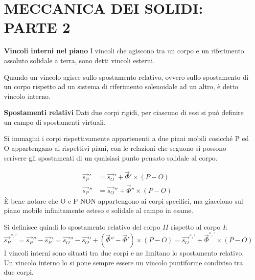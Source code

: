 \documentclass{article}
\begin{document}
	\section*{MECCANICA DEI SOLIDI: PARTE 2} %
	
	\begin{adjustwidth}{2in}{} 
		
	{\Large \textbf{Vincoli interni nel piano}} \mbox{} \newline
		I vincoli che agiscono tra un corpo e un riferimento assoluto solidale a terra, sono detti vincoli esterni. 
		
		Quando un vincolo agisce sullo spostamento relativo, ovvero sullo spostamento di un corpo rispetto ad un sistema di riferimento solenoidale ad un altro, è detto vincolo interno. \newline
		
		\textbf{Spostamenti relativi} \newline
		Dati due corpi rigidi, per ciascuno di essi si può definire un campo di spostamenti virtuali. 
		
		Si immagini i corpi rispettivamente appartenenti a due piani mobili cosicché P ed O appartengano ai rispettivi piani, con le relazioni che seguono si possono scrivere gli spostamenti di un qualsiasi punto pensato solidale al corpo.

		
		\[\begin{split}
			\vec{s_P}' & = \vec{s_O}' + \vec{\Phi}' \times (P-O) \\
			\vec{s_P}'' & = \vec{s_O}'' + \vec{\Phi}'' \times (P-O)
		\end{split}
		\]
		È bene notare che O e P NON appartengono ai corpi specifici, ma giacciono sul piano mobile infinitamente esteso e solidale al campo in esame.
		
		Si definisce quindi lo spostamento relativo del corpo $II$ rispetto al corpo $I$:
		\[
		\vec{s_P}^{'', '} = \vec{s_P}'' - \vec{s_P}' = \vec{s_O}'' - \vec{s_O}'  + (\vec{\Phi}'' - \vec{\Phi}') \times (P-O) = \vec{s_O}^{'', '} + \vec{\Phi}^{'', '} \times (P-O)
		\]
		I vincoli interni sono situati tra due corpi e ne limitano lo spostamento relativo. Un vincolo interno lo si pone sempre essere un vincolo puntiforme condiviso tra due corpi. \newline
		

\end{adjustwidth}
\end{document}
